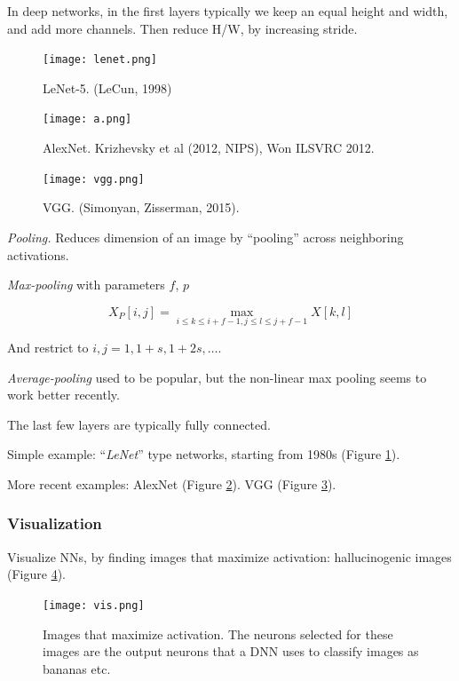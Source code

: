 \documentclass[english]{article}
\begin{document}
In deep networks, in the first layers typically we keep an equal height and width, and add more channels. Then reduce H/W, by increasing stride. %

\begin{figure}
  \centering
  \texttt{[image: lenet.png]}
  \caption{LeNet-5. (LeCun, 1998)}
  \label{lenet5}
\end{figure}


\begin{figure}
  \centering
  \texttt{[image: a.png]}
  \caption{AlexNet. Krizhevsky et al (2012, NIPS), Won ILSVRC 2012.}
  \label{AlexNet}
\end{figure}


\begin{figure}
  \centering
  \texttt{[image: vgg.png]}
    \caption{VGG. (Simonyan, Zisserman, 2015).}
    \label{VGG}
\end{figure}

\eenum 



\item \emph{Pooling.} Reduces dimension of an image by ``pooling'' across neighboring activations. 

\emph{Max-pooling} with parameters $f$, $p$

$$X_P[i,j]=\max_{i\le k \le  i+f-1 ,j \le l \le j+f-1} X[k,l]$$ 

And restrict to $i,j=1,1+s,1+2s,\ldots$.

\emph{Average-pooling} used to be popular, but the non-linear max pooling seems to work better recently. 

\item The last few layers are typically fully connected.

Simple example: ``\emph{LeNet}'' type networks, starting from 1980s (Figure \ref{lenet5}). 

More recent examples: AlexNet (Figure \ref{AlexNet}). VGG (Figure \ref{VGG}). 

\eenum
\subsubsection{Visualization}
\benum

\item Visualize NNs, by finding images that maximize activation: hallucinogenic images (Figure \ref{vis}).

\begin{figure}
  \centering
  \texttt{[image: vis.png]}
    \caption{Images that maximize activation. The neurons selected for these images are the output neurons that a DNN uses to classify images as bananas etc.}
    \label{vis}
\end{figure}
\end{document}
